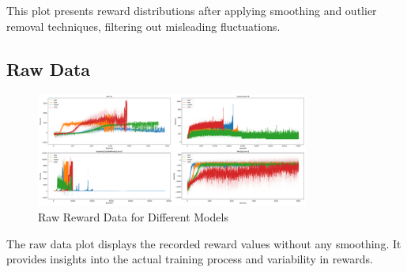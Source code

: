 \documentclass{article}
\begin{document}
This plot presents reward distributions after applying smoothing and outlier removal techniques, filtering out misleading fluctuations.

\subsection*{Raw Data}

\begin{figure}[H]
    \centering
    \includegraphics[width=0.8\textwidth]{.assets/raw_data.png}
    \caption{Raw Reward Data for Different Models}
\end{figure}

The raw data plot displays the recorded reward values without any smoothing. It provides insights into the actual training process and variability in rewards.

\newpage



\end{document}
